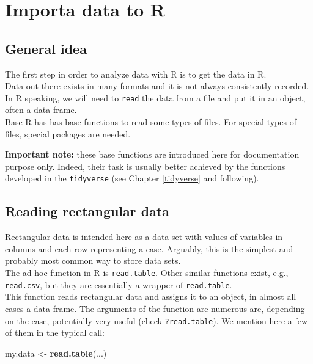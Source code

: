 \documentclass[]{book}
\newenvironment{Shaded}{}{}
\newcommand{\KeywordTok}[1]{\textcolor[rgb]{0.00,0.44,0.13}{\textbf{#1}}}
\newcommand{\NormalTok}[1]{#1}
\newcommand{\StringTok}[1]{\textcolor[rgb]{0.25,0.44,0.63}{#1}}
\theoremstyle{definition}
\theoremstyle{definition}
\theoremstyle{definition}
\theoremstyle{remark}
\begin{document}
\hypertarget{import}{%
\chapter{Importa data to R}\label{import}}

\hypertarget{general-idea}{%
\section{General idea}\label{general-idea}}

The first step in order to analyze data with R is to get the data in
R.\\
Data out there exists in many formats and it is not always consistently
recorded. In R speaking, we will need to \texttt{read} the data from a
file and put it in an object, often a data frame.\\
Base R has has base functions to read some types of files. For special
types of files, special packages are needed.

\textbf{Important note:} these base functions are introduced here for
documentation purpose only. Indeed, their task is usually better
achieved by the functions developed in the \texttt{tidyverse} (see
Chapter \ref{tidyverse} and following).

\hypertarget{reading-rectangular-data}{%
\section{Reading rectangular data}\label{reading-rectangular-data}}

Rectangular data is intended here as a data set with values of variables
in columns and each row representing a case. Arguably, this is the
simplest and probably most common way to store data sets.\\
The ad hoc function in R is \texttt{read.table}. Other similar functions
exist, e.g., \texttt{read.csv}, but they are essentially a wrapper of
\texttt{read.table}.\\
This function reads rectangular data and assigns it to an object, in
almost all cases a data frame. The arguments of the function are
numerous are, depending on the case, potentially very useful (check
\texttt{?read.table}). We mention here a few of them in the typical
call:

\begin{Shaded}
\begin{Highlighting}[]
\NormalTok{my.data <-}\StringTok{ }\KeywordTok{read.table}\NormalTok{(...)}
\end{Highlighting}
\end{Shaded}
\end{document}
